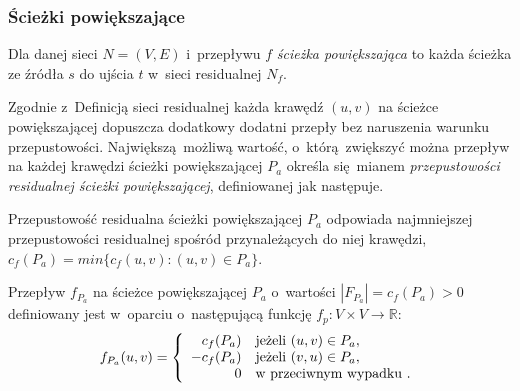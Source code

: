 \subsubsection{\textbf{Ścieżki powiększające}}
\par{
  \begin{definition}
    Dla danej sieci $N=(V,E)$ i~przepływu $f$ \emph{ścieżka powiększająca} to każda ścieżka ze źródła $s$ do ujścia $t$ w~sieci residualnej $N_f$.
  \end{definition}
  Zgodnie z~Definicją sieci residualnej każda krawędź $(u, v)$ na ścieżce powiększającej dopuszcza dodatkowy dodatni przepły bez naruszenia warunku przepustowości.
  Największą możliwą wartość, o~którą zwiększyć można przepływ na każdej krawędzi ścieżki powiększającej $P_a$ określa się mianem \emph{przepustowości residualnej ścieżki powiększającej}, definiowanej jak następuje.
  \begin{definition}
    Przepustowość residualna ścieżki powiększającej $P_a$ odpowiada najmniejszej przepustowości residualnej spośród przynależących do niej krawędzi, $c_f(P_a) = min\{c_f(u, v):(u, v)\in P_a\}$.
  \end{definition}
  \begin{definition}
    Przepływ $f_{P_a}$ na ścieżce powiększającej $P_a$ o~wartości $|F_{P_a}| = c_f(P_a) > 0$ definiowany jest w~oparciu o~następującą funkcję $f_p: V \times V \rightarrow \mathbb{R}$: 
    \begin{equation*}
    f_{P_a}(u, v) = \left\{
    \begin{array}{rl}
    c_f(P_a) & \textnormal{jeżeli } (u, v) \in P_a,\\
    -c_f(P_a) & \textnormal{jeżeli } (v, u) \in P_a,\\
    0 & \textnormal{w przeciwnym wypadku }.
    \end{array} \right.
    \end{equation*}
  \end{definition}
}
